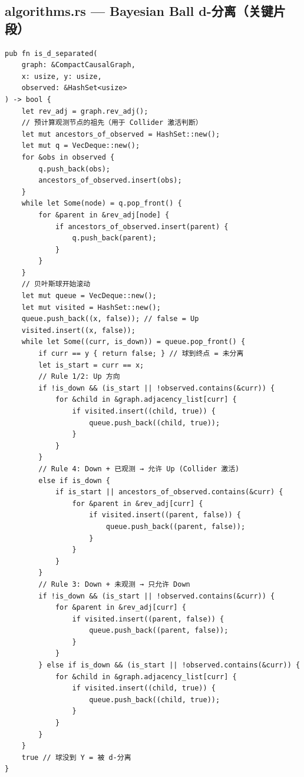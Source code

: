 \documentclass[12pt, a4paper]{ctexart}
\begin{document}
\subsection{algorithms.rs — Bayesian Ball d-分离（关键片段）}

\begin{lstlisting}[style=rust, caption={Bayesian Ball 方向状态 BFS 核心循环}]
pub fn is_d_separated(
    graph: &CompactCausalGraph,
    x: usize, y: usize,
    observed: &HashSet<usize>
) -> bool {
    let rev_adj = graph.rev_adj();
    // 预计算观测节点的祖先（用于 Collider 激活判断）
    let mut ancestors_of_observed = HashSet::new();
    let mut q = VecDeque::new();
    for &obs in observed {
        q.push_back(obs);
        ancestors_of_observed.insert(obs);
    }
    while let Some(node) = q.pop_front() {
        for &parent in &rev_adj[node] {
            if ancestors_of_observed.insert(parent) {
                q.push_back(parent);
            }
        }
    }
    // 贝叶斯球开始滚动
    let mut queue = VecDeque::new();
    let mut visited = HashSet::new();
    queue.push_back((x, false)); // false = Up
    visited.insert((x, false));
    while let Some((curr, is_down)) = queue.pop_front() {
        if curr == y { return false; } // 球到终点 = 未分离
        let is_start = curr == x;
        // Rule 1/2: Up 方向
        if !is_down && (is_start || !observed.contains(&curr)) {
            for &child in &graph.adjacency_list[curr] {
                if visited.insert((child, true)) {
                    queue.push_back((child, true));
                }
            }
        }
        // Rule 4: Down + 已观测 → 允许 Up (Collider 激活)
        else if is_down {
            if is_start || ancestors_of_observed.contains(&curr) {
                for &parent in &rev_adj[curr] {
                    if visited.insert((parent, false)) {
                        queue.push_back((parent, false));
                    }
                }
            }
        }
        // Rule 3: Down + 未观测 → 只允许 Down
        if !is_down && (is_start || !observed.contains(&curr)) {
            for &parent in &rev_adj[curr] {
                if visited.insert((parent, false)) {
                    queue.push_back((parent, false));
                }
            }
        } else if is_down && (is_start || !observed.contains(&curr)) {
            for &child in &graph.adjacency_list[curr] {
                if visited.insert((child, true)) {
                    queue.push_back((child, true));
                }
            }
        }
    }
    true // 球没到 Y = 被 d-分离
}
\end{lstlisting}
\end{document}
